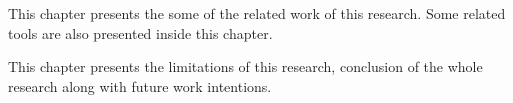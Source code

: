   \vspace{1mm}

\noindent  This chapter presents the some of the related work of this research. Some related tools are also presented inside this chapter.



  \vspace{1mm}

\noindent  This chapter presents the limitations of this research, conclusion of the whole research along with future work intentions.